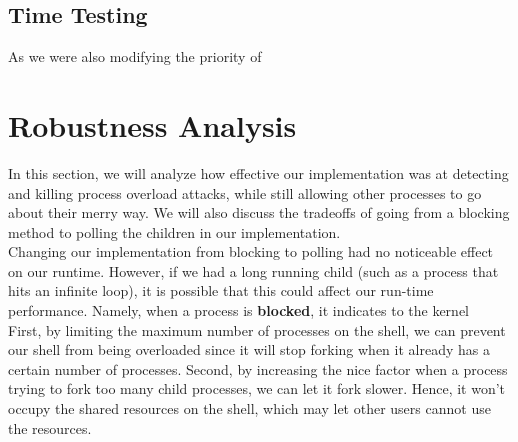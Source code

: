 \documentclass{article}
\begin{document}
\subsection{Time Testing}
As we were also modifying the priority of 




\section{Robustness Analysis}

In this section, we will analyze how effective our implementation was at
detecting and killing process overload attacks, while still allowing other 
processes to go about their merry way. We will also discuss the tradeoffs of
going from a blocking method to polling the children in our implementation. \\


Changing our implementation from blocking to polling had no noticeable effect
on our runtime. However, if we had a long running child (such as a process that
hits an infinite loop), it is possible that this could affect our run-time 
performance. Namely, when a process is \textbf{blocked}, it indicates to the 
kernel  \\


First, by limiting the maximum number of processes on the shell, we can prevent our shell from being overloaded since it will stop forking when it already has a certain number of processes.
Second, by increasing the nice factor when a process trying to fork too many child processes, we can let it fork slower.  Hence, it won’t occupy the shared resources on the shell, which may let other users cannot use the resources. \\ 
\end{document}
